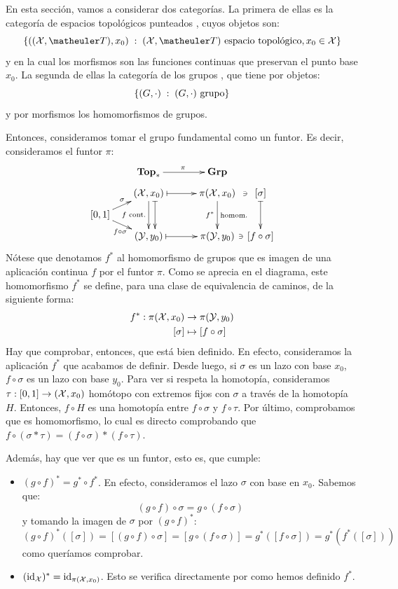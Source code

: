 \begin{const}
	En esta sección, vamos a considerar dos categorías. La primera de ellas es la categoría de espacios topológicos punteados \Topp, cuyos objetos son: 
	\[\{((\X,\T),x_0)\midc (\X,\T)\text{ espacio topológico}, x_0\in\X\}\]
	y en la cual los morfismos son las funciones continuas que preservan el punto base $x_0$. La segunda de ellas la categoría de los grupos \Grp, que tiene por objetos:
	\[\{(G,\cdot)\;:\; (G,\cdot) \text{ grupo}\}\]
	y por morfismos los homomorfismos de grupos.
	
	Entonces, consideramos tomar el grupo fundamental como un funtor. Es decir, consideramos el funtor $\pi$:
	\[\xymatrix @R=0.5pc @C=0.5pc {
		& & \Topp \ar[rrr]^\pi & & & \Grp & \\
		& & (\X,x_0) \ar@{|->}[rrr] \ar[dd]_{f \text{ cont.}} \ar@<1.5ex>@{|->}[dd] & & & \pi(\X,x_0) \ar[dd]_{f^\ast}^{\text{homom.}} \ar@{}[r]|-\ni & [\sigma] \ar@{|->}[dd] \\
		[0,1] \ar[urr]^\sigma \ar[drr]_{f\circ\sigma} & & & & & & \\
		& & (\Y,y_0) \ar@{|->}[rrr] & & & \pi(\Y,y_0) \ar@{}[r]|-\ni & [f\circ\sigma] \\
	}\]
	Nótese que denotamos $f^\ast$ al homomorfismo de grupos que es imagen de una aplicación continua $f$ por el funtor $\pi$.
	Como se aprecia en el diagrama, este homomorfismo $f^\ast$ se define, para una clase de equivalencia de caminos, de la siguiente forma:
	\[\begin{split}
	f^\ast:\pi(\mathcal{X}, x_0) &\to \pi(\mathcal{Y}, y_0) \\
	[\sigma] &\mapsto [f\circ\sigma]
	\end{split}\]
	Hay que comprobar, entonces, que está bien definido. En efecto, consideramos la aplicación $f^\ast$ que acabamos de definir. Desde luego, si $\sigma$ es un lazo con base $x_0$, $f\circ\sigma$ es un lazo con base $y_0$. Para ver si respeta la homotopía, consideramos $\tau:[0,1]\to (\mathcal{X},x_0)$ homótopo con extremos fijos con $\sigma$ a través de la homotopía $H$. Entonces, $f\circ H$ es una homotopía entre $f\circ\sigma$ y $f\circ\tau$. Por último, comprobamos que es homomorfismo, lo cual es directo comprobando que $f\circ(\sigma\ast\tau)=(f\circ\sigma)\ast (f\circ\tau)$.
	
	Además, hay que ver que es un funtor, esto es, que cumple:
	\begin{itemize}
		\item $(g\circ f)^\ast = g^\ast\circ f^\ast$. En efecto, consideramos el lazo $\sigma$ con base en $x_0$. Sabemos que:
		\[(g\circ f)\circ\sigma=g\circ(f\circ\sigma)\]
		y tomando la imagen de $\sigma$ por $(g\circ f)^\ast$:
			\[(g\circ f)^\ast([\sigma])=[(g\circ f)\circ\sigma]=[g\circ(f\circ\sigma)]=g^\ast([f\circ\sigma])=g^\ast(f^\ast([\sigma]))\]
		como queríamos comprobar.
		
		\item $(\operatorname{\mathrm{id}}_{\mathcal{X}})^\ast = \operatorname{\mathrm{id}}_{\pi(\mathcal{X}, x_0)}$. Esto se verifica directamente por como hemos definido $f^\ast$.
	\end{itemize}
\end{const}

